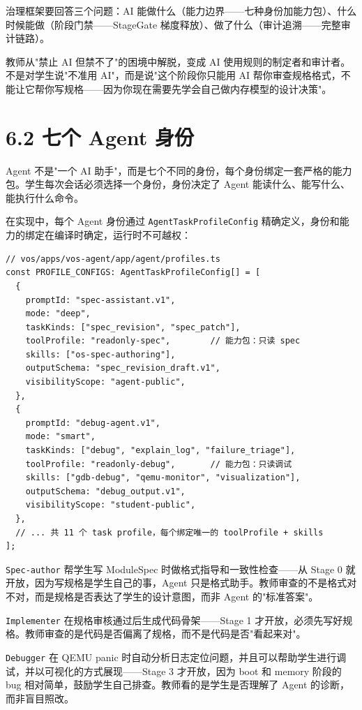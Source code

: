 \documentclass[UTF8,a4paper,12pt,openany]{ctexrep}
\newcommand{\passthrough}[1]{#1}
\begin{document}
治理框架要回答三个问题：AI 能做什么（能力边界------七种身份加能力包）、什么时候能做（阶段门禁------StageGate 梯度释放）、做了什么（审计追溯------完整审计链路）。

教师从"禁止 AI 但禁不了"的困境中解脱，变成 AI 使用规则的制定者和审计者。不是对学生说"不准用 AI"，而是说"这个阶段你只能用 AI 帮你审查规格格式，不能让它帮你写规格------因为你现在需要先学会自己做内存模型的设计决策"。

\section{6.2 七个 Agent 身份}\label{62-ux4e03ux4e2a-agent-ux8eabux4efd}

Agent 不是"一个 AI 助手"，而是七个不同的身份，每个身份绑定一套严格的能力包。学生每次会话必须选择一个身份，身份决定了 Agent 能读什么、能写什么、能执行什么命令。

在实现中，每个 Agent 身份通过 \passthrough{\lstinline!AgentTaskProfileConfig!} 精确定义，身份和能力的绑定在编译时确定，运行时不可越权：

\begin{lstlisting}
// vos/apps/vos-agent/app/agent/profiles.ts
const PROFILE_CONFIGS: AgentTaskProfileConfig[] = [
  {
    promptId: "spec-assistant.v1",
    mode: "deep",
    taskKinds: ["spec_revision", "spec_patch"],
    toolProfile: "readonly-spec",        // 能力包：只读 spec
    skills: ["os-spec-authoring"],
    outputSchema: "spec_revision_draft.v1",
    visibilityScope: "agent-public",
  },
  {
    promptId: "debug-agent.v1",
    mode: "smart",
    taskKinds: ["debug", "explain_log", "failure_triage"],
    toolProfile: "readonly-debug",       // 能力包：只读调试
    skills: ["gdb-debug", "qemu-monitor", "visualization"],
    outputSchema: "debug_output.v1",
    visibilityScope: "student-public",
  },
  // ... 共 11 个 task profile，每个绑定唯一的 toolProfile + skills
];
\end{lstlisting}

\passthrough{\lstinline!Spec-author!} 帮学生写 ModuleSpec 时做格式指导和一致性检查------从 Stage 0 就开放，因为写规格是学生自己的事，Agent 只是格式助手。教师审查的不是格式对不对，而是规格是否表达了学生的设计意图，而非 Agent 的"标准答案"。

\passthrough{\lstinline!Implementer!} 在规格审核通过后生成代码骨架------Stage 1 才开放，必须先写好规格。教师审查的是代码是否偏离了规格，而不是代码是否"看起来对"。

\passthrough{\lstinline!Debugger!} 在 QEMU panic 时自动分析日志定位问题，并且可以帮助学生进行调试，并以可视化的方式展现------Stage 3 才开放，因为 boot 和 memory 阶段的 bug 相对简单，鼓励学生自己排查。教师看的是学生是否理解了 Agent 的诊断，而非盲目照改。
\end{document}
